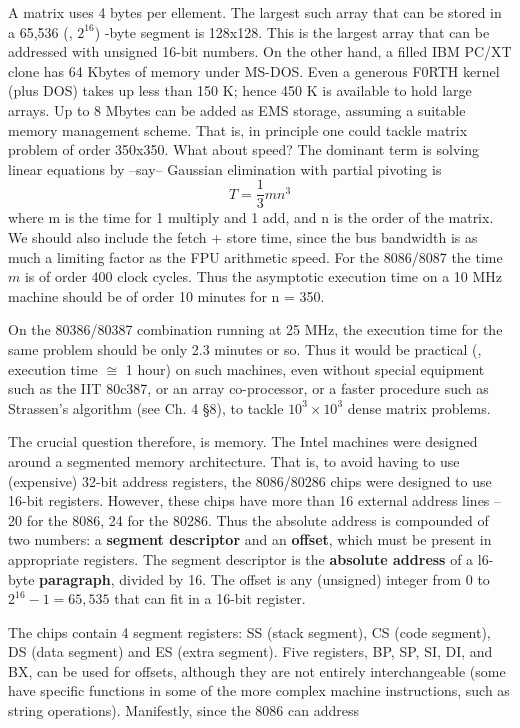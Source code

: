 A  matrix uses 4 bytes per ellement. The largest such array that can be stored in a 65,536 (\ie, $2^{16}$) -byte segment is 128x128. This is the largest array that can be addressed with unsigned 16-bit numbers. On the other hand, a filled IBM PC/XT clone has 64 Kbytes of memory under MS-DOS. Even a generous F0RTH kernel (plus DOS) takes up less than 150 K; hence 450 K is available to hold large arrays. Up to 8 Mbytes can be added as EMS storage, assuming a suitable memory management scheme. That is, in principle one could tackle matrix problem of order 350x350. What about speed? The dominant term is solving linear equations by --say-- Gaussian elimination with partial pivoting is
\[
T = \frac{1}{3} mn^{3}
\]
where m is the time for 1 multiply and 1 add, and n is the order of the matrix. We should also include the fetch + store time, since the bus bandwidth is as much a limiting factor as the FPU arithmetic speed. For the 8086/8087 the time $m$ is of order 400 clock cycles. Thus the asymptotic execution time on a 10 MHz machine should be of order 10 minutes for n = 350.

On the 80386/80387 combination running at 25 MHz, the execution time for the same problem should be only 2.3 minutes or so. Thus it would be practical (\ie, execution time $\cong$ 1 hour) on such machines, even without special equipment such as the IIT 80c387, or an array co-processor, or a faster procedure such as Strassen's algorithm (see Ch. 4 \S8), to tackle $10^{3} \times 10^{3}$ dense matrix problems.

The crucial question therefore, is memory. The Intel machines were designed around a segmented memory architecture. That is, to avoid having to use (expensive) 32-bit address registers, the 8086/80286 chips were designed to use 16-bit registers. However, these chips have more than 16 external address lines -- 20 for the 8086, 24 for the 80286. Thus the absolute address is compounded of two numbers: a \textbf{segment descriptor} and an \textbf{offset}, which must be present in appropriate registers. The segment descriptor is the \textbf{absolute address} of a l6-byte \textbf{paragraph}, divided by 16. The offset is any (unsigned) integer from 0 to $2^{16}-1 = 65,535$ that can fit in a 16-bit register.

The chips contain 4 segment registers: SS (stack segment), CS (code segment), DS (data segment) and ES (extra segment). Five registers, BP, SP, SI, DI, and BX, can be used for offsets, although they are not entirely interchangeable (some have specific functions in some of the more complex machine instructions, such as string operations). Manifestly, since the 8086 can address


